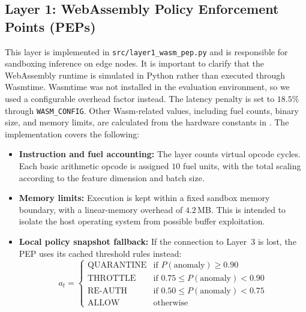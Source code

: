 \documentclass[11pt,a4paper]{article}
\begin{document}
\subsection{Layer 1: WebAssembly Policy Enforcement Points (PEPs)}
This layer is implemented in \texttt{src/layer1\_wasm\_pep.py} and is responsible for sandboxing inference on edge nodes. It is important to clarify that the WebAssembly runtime is simulated in Python rather than executed through Wasmtime. Wasmtime was not installed in the evaluation environment, so we used a configurable overhead factor instead. The latency penalty is set to $18.5\%$ through \texttt{WASM\_CONFIG}. Other Wasm-related values, including fuel counts, binary size, and memory limits, are calculated from the hardware constants in . The implementation covers the following:
\begin{itemize}[leftmargin=1.6em,itemsep=1pt]
    \item \textbf{Instruction and fuel accounting:} The layer counts virtual opcode cycles. Each basic arithmetic opcode is assigned $10$ fuel units, with the total scaling according to the feature dimension and batch size.
    \item \textbf{Memory limits:} Execution is kept within a fixed sandbox memory boundary, with a linear-memory overhead of $4.2$\,MB. This is intended to isolate the host operating system from possible buffer exploitation.
    \item \textbf{Local policy snapshot fallback:} If the connection to Layer~3 is lost, the PEP uses its cached threshold rules instead:
    \begin{equation}
        a_t = \begin{cases}
            \text{QUARANTINE} & \text{if } P(\text{anomaly}) \ge 0.90 \\
            \text{THROTTLE} & \text{if } 0.75 \le P(\text{anomaly}) < 0.90 \\
            \text{RE-AUTH} & \text{if } 0.50 \le P(\text{anomaly}) < 0.75 \\
            \text{ALLOW} & \text{otherwise}
        \end{cases}
    \end{equation}
\end{itemize}
\end{document}
